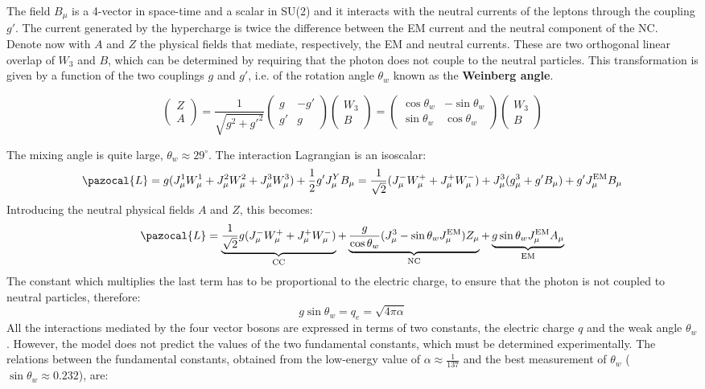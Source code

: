\documentclass[10.75pt,a4paper,openright,bottom=2cm]{article}
\newcommand{\beginbox}[1]{\begin{tcolorbox}[width=\textwidth,colback={yellow!50},title={#1},colbacktitle={gray!50},coltitle=black]}
\renewcommand{\endbox}{\end{tcolorbox}\noindent}
\begin{document}
The field $B_\mu$ is a 4-vector in space-time and a scalar in SU(2) and it interacts with the neutral currents of the leptons through the coupling $g'$. The current generated by the hypercharge is twice the difference between the EM current and the neutral component of the NC.\\
Denote now with $A$ and $Z$ the physical fields that mediate, respectively, the EM and neutral currents. These are two orthogonal linear overlap of $W_3$ and $B$, which can be determined by requiring that the photon does not couple to the neutral particles. This transformation is given by a function of the two couplings $g$ and $g'$, i.e. of the rotation angle $\theta_w$ known as the \textbf{Weinberg angle}.
\beginbox{Mixing Angle $\theta_w$}
\[
\begin{pmatrix}
    Z\\A
\end{pmatrix}=\frac{1}{\sqrt{g^2+g'^2}}\begin{pmatrix}
    g & -g'\\g' & g
\end{pmatrix}
\begin{pmatrix}
    W_3\\B
\end{pmatrix}=\begin{pmatrix}
    \cos\theta_w & -\sin\theta_w\\ \sin\theta_w & \cos\theta_w
\end{pmatrix}
\begin{pmatrix}
    W_3\\B
\end{pmatrix}
\]
\endbox
The mixing angle is quite large, $\theta_w\approx29^\circ$. The interaction Lagrangian is an isoscalar:
\[
\pazocal{L}=g(J_\mu^1W_\mu^1+J_\mu^2W_\mu^2+J_\mu^3W_\mu^3)+\frac{1}{2}g'J_\mu^YB_\mu=\frac{1}{\sqrt{2}}(J_\mu^-W_\mu^++J_\mu^+W_\mu^-)+J_\mu^3(g_\mu^3+g'B_\mu)+g'J_\mu^{\text{EM}}B_\mu
\]
Introducing the neutral physical fields $A$ and $Z$, this becomes:
\[
\pazocal{L}=\underbrace{\frac{1}{\sqrt{2}}g(J_\mu^-W_\mu^++J_\mu^+W_\mu^-)}_{\text{CC}}+\underbrace{\frac{g}{\cos\theta_w}(J_\mu^3-\sin\theta_wJ_\mu^{\text{EM}})Z_\mu}_{\text{NC}}+\underbrace{g\sin\theta_wJ_\mu^{\text{EM}}A_\mu}_{\text{EM}}
\]
The constant which multiplies the last term has to be proportional to the electric charge, to ensure that the photon is not coupled to neutral particles, therefore:
\[
g\sin\theta_w=q_e=\sqrt{4\pi\alpha}
\]
All the interactions mediated by the four vector bosons are expressed in terms of two constants, the electric charge $q$ and the weak angle $\theta_w$. However, the model does not predict the values of the two fundamental constants, which must be determined experimentally. The relations between the fundamental constants, obtained from the low-energy value of $\alpha\approx\frac{1}{137}$ and the best measurement of $\theta_w$ ($\sin\theta_w\approx0.232$), are:
\end{document}
